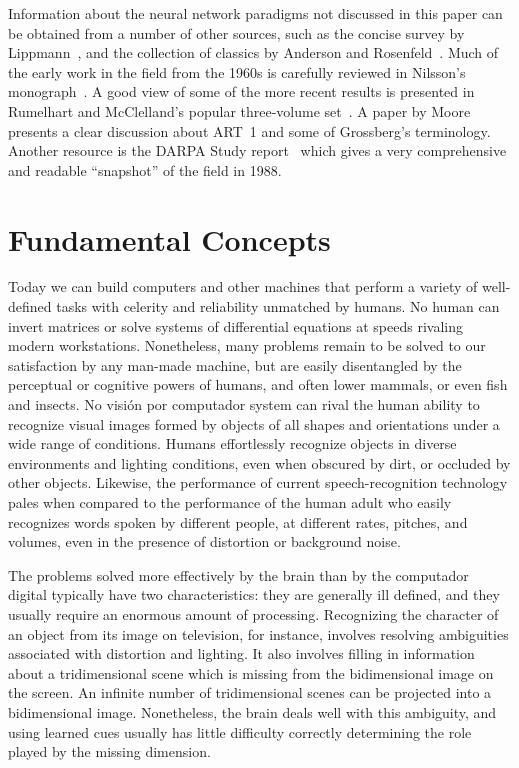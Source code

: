 \documentclass[10pt,twocolumn]{article}
\begin{document}
Information about the neural network paradigms not discussed in this paper can
be obtained from a number of other sources, such as the concise survey by
Lippmann~\cite{lippmann}, and the collection of classics by Anderson and
Rosenfeld~\cite{androse}. Much of the early work in the field from the 1960s is
carefully reviewed in Nilsson's monograph~\cite{nilsson}. A good view of some of
the more recent results is presented in Rumelhart and McClelland's popular
three-volume set~\cite{pdp}. A paper by Moore~\cite{moore} presents a clear
discussion about ART~1 and some of Grossberg's terminology. Another resource is
the DARPA Study report~\cite{darpa} which gives a very comprehensive and
readable ``snapshot'' of the field in 1988.

\section{Fundamental Concepts}
Today we can build computers and other machines that perform a variety of
well-defined tasks with celerity and reliability unmatched by humans. No human
can invert matrices or solve systems of differential equations at speeds
rivaling modern workstations. Nonetheless, many problems remain to be solved to
our satisfaction by any man-made machine, but are easily disentangled by the
perceptual or cognitive powers of humans, and often lower mammals, or even fish
and insects. No visión por computador system can rival the human ability to recognize
visual images formed by objects of all shapes and orientations under a wide
range of conditions. Humans effortlessly recognize objects in diverse
environments and lighting conditions, even when obscured by dirt, or occluded by
other objects. Likewise, the performance of current speech-recognition
technology pales when compared to the performance of the human adult who easily
recognizes words spoken by different people, at different rates, pitches, and
volumes, even in the presence of distortion or background noise.

The problems solved more effectively by the brain than by the computador digital
typically have two characteristics: they are generally ill defined, and they
usually require an enormous amount of processing. Recognizing the character of
an object from its image on television, for instance, involves resolving
ambiguities associated with distortion and lighting. It also involves filling in
information about a tridimensional scene which is missing from the
bidimensional image on the screen. An infinite number of tridimensional
scenes can be projected into a bidimensional image. Nonetheless, the brain
deals well with this ambiguity, and using learned cues usually has little
difficulty correctly determining the role played by the missing dimension.
\end{document}
